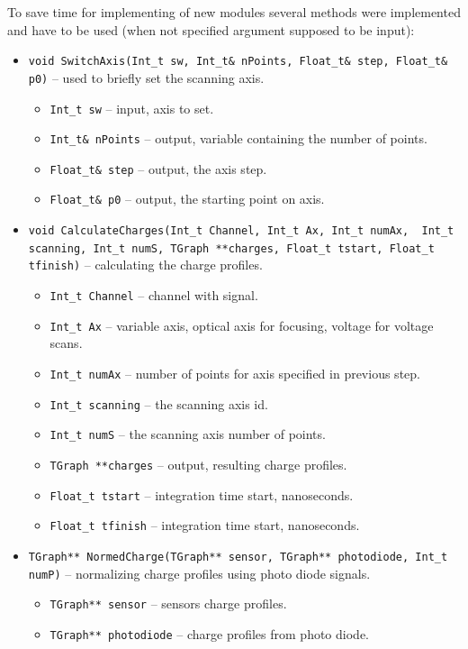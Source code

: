 \documentclass[12pt,oneside,notitlepage,abstracton,a4paper]{scrartcl}
\begin{document}
To save time for implementing of new modules several methods were implemented and have to be used (when not specified argument supposed to be input):
\begin{itemize}
\item \lstinline$void SwitchAxis(Int_t sw, Int_t& nPoints, Float_t& step, Float_t& p0)$ -- used to briefly set the scanning axis.
\begin{itemize}
\item \lstinline$Int_t sw$ -- input, axis to set.
\item \lstinline$Int_t& nPoints$ -- output, variable containing the number of points.
\item \lstinline$Float_t& step$ -- output, the axis step.
\item \lstinline$Float_t& p0$ -- output, the starting point on axis.
\end{itemize}
\item \lstinline$void CalculateCharges(Int_t Channel, Int_t Ax, Int_t numAx,  Int_t scanning, Int_t numS, TGraph **charges, Float_t tstart, Float_t tfinish)$ -- calculating the charge profiles.
\begin{itemize}
\item \lstinline$Int_t Channel$ -- channel with signal.
\item \lstinline$Int_t Ax$ -- variable axis, optical axis for focusing, voltage for voltage scans.
\item \lstinline$Int_t numAx$ -- number of points for axis specified in previous step.
\item \lstinline$Int_t scanning$ -- the scanning axis id.
\item \lstinline$Int_t numS$ -- the scanning axis number of points.
\item \lstinline$TGraph **charges$ -- output, resulting charge profiles.
\item \lstinline$Float_t tstart$ -- integration time start, nanoseconds.
\item \lstinline$Float_t tfinish$ -- integration time start, nanoseconds.
\end{itemize}
\item \lstinline$TGraph** NormedCharge(TGraph** sensor, TGraph** photodiode, Int_t numP)$ -- normalizing charge profiles using photo diode signals.
\begin{itemize}
\item \lstinline$TGraph** sensor$ --  sensors charge profiles.
\item \lstinline$TGraph** photodiode$ -- charge profiles from photo diode.

\end{itemize}
\end{itemize}
\end{document}
